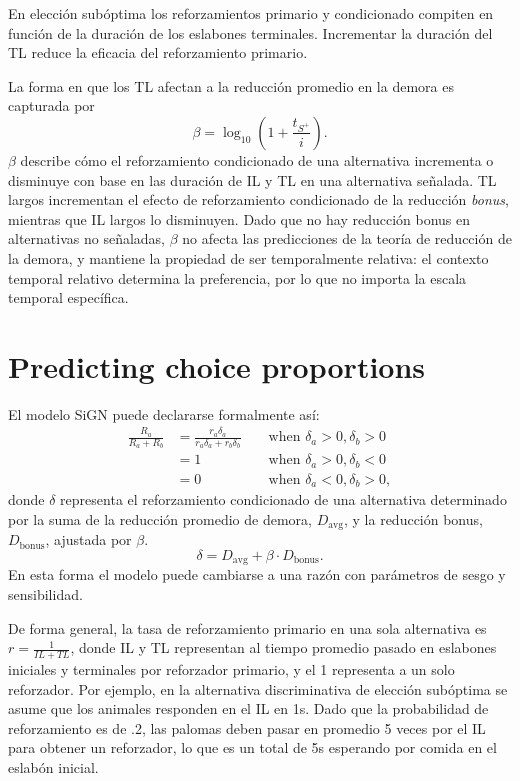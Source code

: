 \documentclass[a4paper,12pt]{article}
\begin{document}
En elección subóptima los reforzamientos primario y condicionado compiten en función de la duración de los eslabones terminales.
Incrementar la duración del TL reduce la eficacia del reforzamiento primario.

La forma en que los TL afectan a la reducción promedio en la demora es capturada por
\[
    \beta = \log_{10}\left(1 + \frac{t_{S^{+}}}{i}\right)
.\]
$\beta$ describe cómo el reforzamiento condicionado de una alternativa incrementa o disminuye con base en las duración de IL y TL en una alternativa señalada.
TL largos incrementan el efecto de reforzamiento condicionado de la reducción {\itshape bonus}, mientras que IL largos lo disminuyen.
Dado que no hay reducción bonus en alternativas no señaladas, $\beta$ no afecta las predicciones de la teoría de reducción de la demora, y mantiene la propiedad de ser temporalmente relativa: el contexto temporal relativo determina la preferencia, por lo que no importa la escala temporal específica.

\section{Predicting choice proportions}

El modelo SiGN puede declararse formalmente así:
\[
    \begin{array}{cccc}
        \frac{R_a}{R_a+R_b} & =\frac{r_a \delta_a}{r_a \delta_a+r_b \delta_b} & & \mbox{ when } \delta_a>0, \delta_b>0 \\
                            & =1 & & \mbox{ when } \delta_a>0, \delta_b<0 \\
                            & =0 & & \mbox{ when } \delta_a<0, \delta_b>0,
    \end{array}
\]
donde $\delta$ representa el reforzamiento condicionado de una alternativa determinado por la suma de la reducción promedio de demora, $D_{\mbox{avg}}$, y la reducción bonus, $D_{\mbox{bonus}}$, ajustada por $\beta$.
 \[
\delta = D_{\mbox{avg}} + \beta \cdot D_{\mbox{bonus}}
.\]
En esta forma el modelo puede cambiarse a una razón con parámetros de sesgo y sensibilidad.

De forma general, la tasa de reforzamiento primario en una sola alternativa es $r = \frac{1}{IL + TL}$, donde IL y TL representan al tiempo promedio pasado en eslabones iniciales y terminales por reforzador primario, y el 1 representa a un solo reforzador. Por ejemplo, en la alternativa discriminativa de elección subóptima se asume que los animales responden en el IL en 1s. Dado que la probabilidad de reforzamiento es de .2, las palomas deben pasar en promedio 5 veces por el IL para obtener un reforzador, lo que es un total de 5s esperando por comida en el eslabón inicial.
\end{document}
